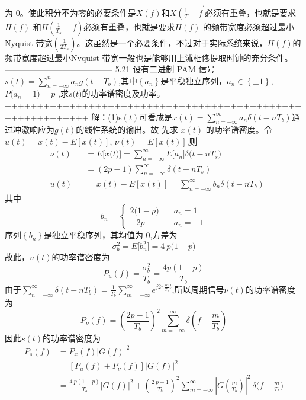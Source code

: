 \documentclass[utf8]{article}
\begin{document}
为 0。使此积分不为零的必要条件是$X(f)$和$X\left(\frac1T-f\right.^{\prime}$必须有重叠，也就是要求$H(f)$ 和$H\left(\frac1{T_s}-f\right)$必须有重叠，也就是要求$H(f)$ 的频带宽度必须超过最小 Nyquist 带宽$(\frac{1}{2T_{s}})$。这虽然是一个必要条件，不过对于实际系统来说，$H(f)$的频带宽度超过最小Nvquist 带宽一般也是能够用上沭框佟提取时钟的充分条件。
---------------------------------------
5.21 设有二进制 PAM 信号 $s(t)=\sum_{n=-\infty}^na_ng\left(t-T_b\right)$,其中$\left\{a_n\right\}$是平稳独立序列，$a_n\in\left\{\pm1\right\}$,
$P\big(a_{n}=1\big)=p$ ,求$s\big(t\big)$的功率谱密度及功率。
+++++++++++++++++++++++++++++++++++++++++++++++++++++++++++
解：(1)s$(t)$可看成是$x(t)=\sum_{n=-\infty}^\infty a_n\delta(t-nT_b)$通过冲激响应为$g(t)$的线性系统的输出。故
先求 $x(t)$ 的功率谱密度。令$u( t) = x( t) - E[ x( t) ]$, $\nu ( t) = E[ x( t) ]$,则
$$\begin{aligned}&\nu\left(t\right)&&=E\Big[x\Big(t\Big)\Big]=\sum_{n=-\infty}^{\infty}E\Big[a_{n}\Big]\delta\Big(t-nT_{s}\Big)\\&&&=\left(2p-1\right)\sum_{n=-\infty}^{\infty}\delta\left(t-nT_{s}\right)\\&u\left(t\right)&&=x\left(t\right)-E\left[x\left(t\right)\right]=\sum_{n=-\infty}^{\infty}b_{n}\delta\left(t-nT_{b}\right)\end{aligned}$$
其中
$$b_n=\begin{cases}2\bigl(1-p\bigr)&\quad a_n=1\\-2p&\quad a_n=-1\end{cases}$$
序列$\left\{b_n\right\}$是独立平稳序列，其均值为 0,方差为
$$\sigma_b^2=E\bigg[b_n^2\bigg]=4\:p\big(1-p\big)$$
故此，$u(t)$的功率谱密度为
$$P_u\left(f\right)=\frac{\sigma_b^2}{T_b}=\frac{4p\left(1-p\right)}{T_b}$$
由于$\sum_{n=-\infty}^{\infty}\delta\left(t-nT_{b}\right)=\frac{1}{T_{b}}\sum_{m=-\infty}^{\infty}e^{j2\pi\frac{m}{T_{b}}t}$,所以周期信号$\nu(t)$的功率谱密度为
$$P_\nu\left(f\right)=\left(\frac{2p-1}{T_b}\right)^2\sum_{m=-\infty}^\infty\delta\left(f-\frac{m}{T_b}\right)$$
因此$s(t)$的功率谱密度为
$$\begin{aligned}P_{s}\left(f\right)&=P_{x}\left(f\right)\left|G\left(f\right)\right|^{2}\\&=\left[P_{u}\left(f\right)+P_{\nu}\left(f\right)\right]\left|G\left(f\right)\right|^{2}\\&=\frac{4\:p\left(1-p\right)}{T_{b}}\Big|G\left(f\right)\Big|^{2}+\left(\frac{2\:p-1}{T_{b}}\right)^{2}\sum_{m=-\infty}^{\infty}\left|G\left(\frac{m}{T_{b}}\right)\right|^{2}\:\delta\Bigg(f-\frac{m}{T_{b}}\Bigg)\end{aligned}$$
\end{document}
